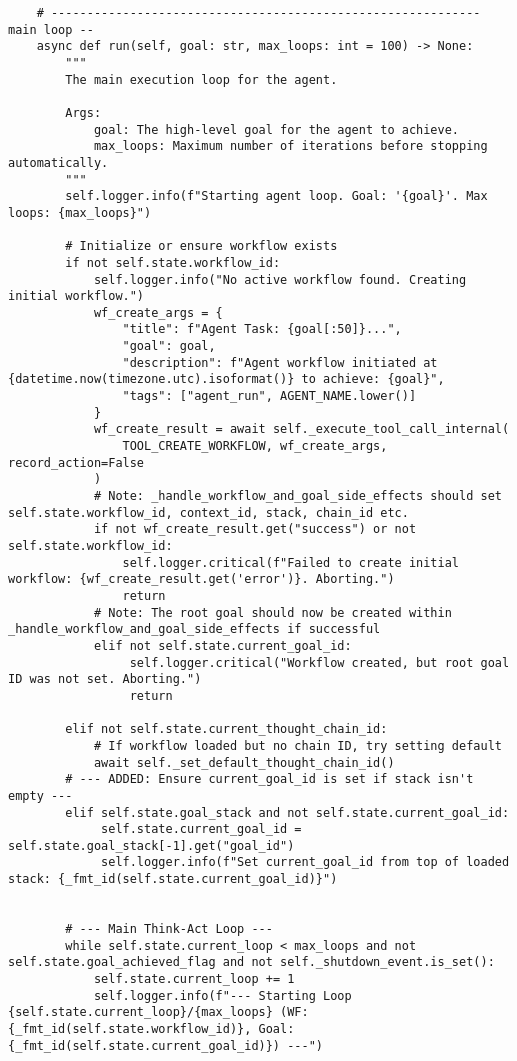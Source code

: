 \documentclass[12pt,a4paper]{article}
\begin{document}
\begin{pageablecode}
\begin{verbatim}
    # ------------------------------------------------------------ main loop --
    async def run(self, goal: str, max_loops: int = 100) -> None:
        """
        The main execution loop for the agent.

        Args:
            goal: The high-level goal for the agent to achieve.
            max_loops: Maximum number of iterations before stopping automatically.
        """
        self.logger.info(f"Starting agent loop. Goal: '{goal}'. Max loops: {max_loops}")

        # Initialize or ensure workflow exists
        if not self.state.workflow_id:
            self.logger.info("No active workflow found. Creating initial workflow.")
            wf_create_args = {
                "title": f"Agent Task: {goal[:50]}...",
                "goal": goal,
                "description": f"Agent workflow initiated at {datetime.now(timezone.utc).isoformat()} to achieve: {goal}",
                "tags": ["agent_run", AGENT_NAME.lower()]
            }
            wf_create_result = await self._execute_tool_call_internal(
                TOOL_CREATE_WORKFLOW, wf_create_args, record_action=False
            )
            # Note: _handle_workflow_and_goal_side_effects should set self.state.workflow_id, context_id, stack, chain_id etc.
            if not wf_create_result.get("success") or not self.state.workflow_id:
                self.logger.critical(f"Failed to create initial workflow: {wf_create_result.get('error')}. Aborting.")
                return
            # Note: The root goal should now be created within _handle_workflow_and_goal_side_effects if successful
            elif not self.state.current_goal_id:
                 self.logger.critical("Workflow created, but root goal ID was not set. Aborting.")
                 return

        elif not self.state.current_thought_chain_id:
            # If workflow loaded but no chain ID, try setting default
            await self._set_default_thought_chain_id()
        # --- ADDED: Ensure current_goal_id is set if stack isn't empty ---
        elif self.state.goal_stack and not self.state.current_goal_id:
             self.state.current_goal_id = self.state.goal_stack[-1].get("goal_id")
             self.logger.info(f"Set current_goal_id from top of loaded stack: {_fmt_id(self.state.current_goal_id)}")


        # --- Main Think-Act Loop ---
        while self.state.current_loop < max_loops and not self.state.goal_achieved_flag and not self._shutdown_event.is_set():
            self.state.current_loop += 1
            self.logger.info(f"--- Starting Loop {self.state.current_loop}/{max_loops} (WF: {_fmt_id(self.state.workflow_id)}, Goal: {_fmt_id(self.state.current_goal_id)}) ---")


\end{verbatim}
\end{pageablecode}
\end{document}

